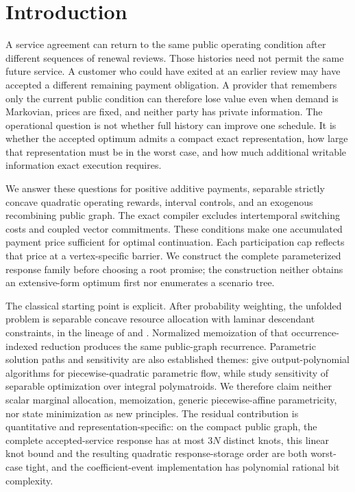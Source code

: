 \section{Introduction}\label{sec:introduction}
A service agreement can return to the same public operating condition after different sequences of renewal reviews. Those histories need not permit the same future service. A customer who could have exited at an earlier review may have accepted a different remaining payment obligation. A provider that remembers only the current public condition can therefore lose value even when demand is Markovian, prices are fixed, and neither party has private information. The operational question is not whether full history can improve one schedule. It is whether the accepted optimum admits a compact exact representation, how large that representation must be in the worst case, and how much additional writable information exact execution requires.

We answer these questions for positive additive payments, separable strictly concave quadratic operating rewards, interval controls, and an exogenous recombining public graph. The exact compiler excludes intertemporal switching costs and coupled vector commitments. These conditions make one accumulated payment price sufficient for optimal continuation. Each participation cap reflects that price at a vertex-specific barrier. We construct the complete parameterized response family before choosing a root promise; the construction neither obtains an extensive-form optimum first nor enumerates a scenario tree.

The classical starting point is explicit. After probability weighting, the unfolded problem is separable concave resource allocation with laminar descendant constraints, in the lineage of \citet{Mjelde1983} and \citet{Tang1990}. Normalized memoization of that occurrence-indexed reduction produces the same public-graph recurrence. Parametric solution paths and sensitivity are also established themes: \citet{KlimmWarode2021} give output-polynomial algorithms for piecewise-quadratic parametric flow, while \citet{HarksKlimmPeis2018} study sensitivity of separable optimization over integral polymatroids. We therefore claim neither scalar marginal allocation, memoization, generic piecewise-affine parametricity, nor state minimization as new principles. The residual contribution is quantitative and representation-specific: on the compact public graph, the complete accepted-service response has at most $3N$ distinct knots, this linear knot bound and the resulting quadratic response-storage order are both worst-case tight, and the coefficient-event implementation has polynomial rational bit complexity.

